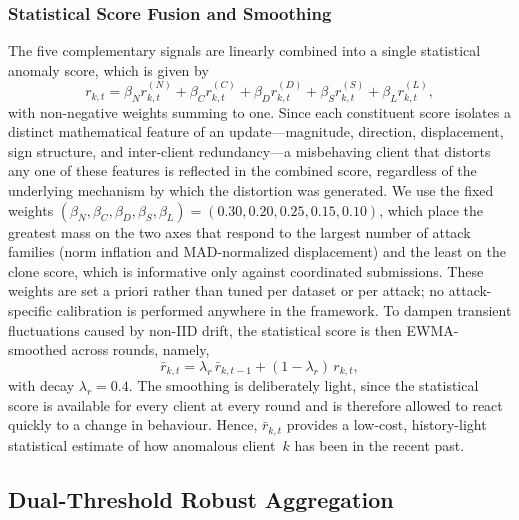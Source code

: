 \documentclass[journal]{IEEEtran}
\begin{document}
\subsubsection{Statistical Score Fusion and Smoothing}
The five complementary signals are linearly combined into a single statistical anomaly score, which is given by
\begin{equation}
r_{k,t} = \beta_N r_{k,t}^{(N)} + \beta_C r_{k,t}^{(C)} + \beta_D r_{k,t}^{(D)} + \beta_S r_{k,t}^{(S)} + \beta_L r_{k,t}^{(L)},
\label{eq:stat_score}
\end{equation}
with non-negative weights summing to one. Since each constituent score isolates a distinct mathematical feature of an update---magnitude, direction, displacement, sign structure, and inter-client redundancy---a misbehaving client that distorts any one of these features is reflected in the combined score, regardless of the underlying mechanism by which the distortion was generated. We use the fixed weights $(\beta_N, \beta_C, \beta_D, \beta_S, \beta_L) = (0.30, 0.20, 0.25, 0.15, 0.10)$, which place the greatest mass on the two axes that respond to the largest number of attack families (norm inflation and MAD-normalized displacement) and the least on the clone score, which is informative only against coordinated submissions. These weights are set a priori rather than tuned per dataset or per attack; no attack-specific calibration is performed anywhere in the framework. To dampen transient fluctuations caused by non-IID drift, the statistical score is then EWMA-smoothed across rounds, namely,
\begin{equation}
\bar r_{k,t} = \lambda_r\,\bar r_{k,t-1} + (1-\lambda_r)\,r_{k,t},
\label{eq:stat_ewma}
\end{equation}
with decay $\lambda_r = 0.4$. The smoothing is deliberately light, since the statistical score is available for every client at every round and is therefore allowed to react quickly to a change in behaviour. Hence, $\bar r_{k,t}$ provides a low-cost, history-light statistical estimate of how anomalous client~$k$ has been in the recent past.

\subsection{Dual-Threshold Robust Aggregation}
\label{sec:dual_threshold}
\end{document}

